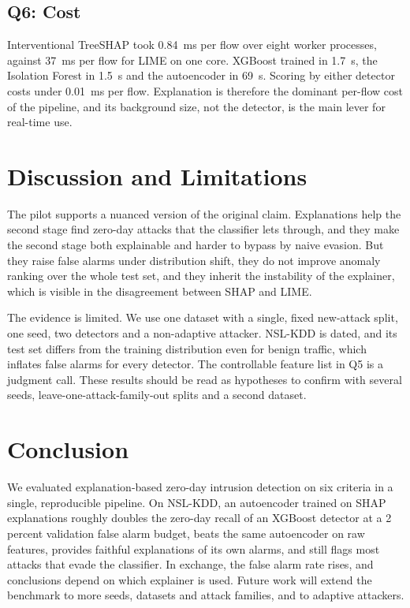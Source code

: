 \documentclass[conference]{IEEEtran}
\begin{document}
\subsection{Q6: Cost}
Interventional TreeSHAP took 0.84~ms per flow over eight worker processes, against 37~ms per flow for LIME on one core. XGBoost trained in 1.7~s, the Isolation Forest in 1.5~s and the autoencoder in 69~s. Scoring by either detector costs under 0.01~ms per flow. Explanation is therefore the dominant per-flow cost of the pipeline, and its background size, not the detector, is the main lever for real-time use.

\section{Discussion and Limitations}
The pilot supports a nuanced version of the original claim. Explanations help the second stage find zero-day attacks that the classifier lets through, and they make the second stage both explainable and harder to bypass by naive evasion. But they raise false alarms under distribution shift, they do not improve anomaly ranking over the whole test set, and they inherit the instability of the explainer, which is visible in the disagreement between SHAP and LIME.

The evidence is limited. We use one dataset with a single, fixed new-attack split, one seed, two detectors and a non-adaptive attacker. NSL-KDD is dated, and its test set differs from the training distribution even for benign traffic, which inflates false alarms for every detector. The controllable feature list in Q5 is a judgment call. These results should be read as hypotheses to confirm with several seeds, leave-one-attack-family-out splits and a second dataset.

\section{Conclusion}
We evaluated explanation-based zero-day intrusion detection on six criteria in a single, reproducible pipeline. On NSL-KDD, an autoencoder trained on SHAP explanations roughly doubles the zero-day recall of an XGBoost detector at a 2 percent validation false alarm budget, beats the same autoencoder on raw features, provides faithful explanations of its own alarms, and still flags most attacks that evade the classifier. In exchange, the false alarm rate rises, and conclusions depend on which explainer is used. Future work will extend the benchmark to more seeds, datasets and attack families, and to adaptive attackers.



\end{document}
